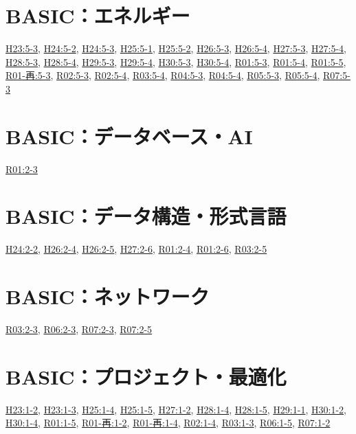 \section{BASIC：エネルギー}
\hyperref[q:h23-reg-basic-5-3]{H23:5-3}, \hyperref[q:h24-reg-basic-5-2]{H24:5-2}, \hyperref[q:h24-reg-basic-5-3]{H24:5-3}, \hyperref[q:h25-reg-basic-5-1]{H25:5-1}, \hyperref[q:h25-reg-basic-5-2]{H25:5-2}, \hyperref[q:h26-reg-basic-5-3]{H26:5-3}, \hyperref[q:h26-reg-basic-5-4]{H26:5-4}, \hyperref[q:h27-reg-basic-5-3]{H27:5-3}, \hyperref[q:h27-reg-basic-5-4]{H27:5-4}, \hyperref[q:h28-reg-basic-5-3]{H28:5-3}, \hyperref[q:h28-reg-basic-5-4]{H28:5-4}, \hyperref[q:h29-reg-basic-5-3]{H29:5-3}, \hyperref[q:h29-reg-basic-5-4]{H29:5-4}, \hyperref[q:h30-reg-basic-5-3]{H30:5-3}, \hyperref[q:h30-reg-basic-5-4]{H30:5-4}, \hyperref[q:r01-reg-basic-5-3]{R01:5-3}, \hyperref[q:r01-reg-basic-5-4]{R01:5-4}, \hyperref[q:r01-reg-basic-5-5]{R01:5-5}, \hyperref[q:r01-ret-basic-5-3]{R01-再:5-3}, \hyperref[q:r02-reg-basic-5-3]{R02:5-3}, \hyperref[q:r02-reg-basic-5-4]{R02:5-4}, \hyperref[q:r03-reg-basic-5-4]{R03:5-4}, \hyperref[q:r04-reg-basic-5-3]{R04:5-3}, \hyperref[q:r04-reg-basic-5-4]{R04:5-4}, \hyperref[q:r05-reg-basic-5-3]{R05:5-3}, \hyperref[q:r05-reg-basic-5-4]{R05:5-4}, \hyperref[q:r07-reg-basic-5-3]{R07:5-3}
\section{BASIC：データベース・AI}
\hyperref[q:r01-reg-basic-2-3]{R01:2-3}
\section{BASIC：データ構造・形式言語}
\hyperref[q:h24-reg-basic-2-2]{H24:2-2}, \hyperref[q:h26-reg-basic-2-4]{H26:2-4}, \hyperref[q:h26-reg-basic-2-5]{H26:2-5}, \hyperref[q:h27-reg-basic-2-6]{H27:2-6}, \hyperref[q:r01-reg-basic-2-4]{R01:2-4}, \hyperref[q:r01-reg-basic-2-6]{R01:2-6}, \hyperref[q:r03-reg-basic-2-5]{R03:2-5}
\section{BASIC：ネットワーク}
\hyperref[q:r03-reg-basic-2-3]{R03:2-3}, \hyperref[q:r06-reg-basic-2-3]{R06:2-3}, \hyperref[q:r07-reg-basic-2-3]{R07:2-3}, \hyperref[q:r07-reg-basic-2-5]{R07:2-5}
\section{BASIC：プロジェクト・最適化}
\hyperref[q:h23-reg-basic-1-2]{H23:1-2}, \hyperref[q:h23-reg-basic-1-3]{H23:1-3}, \hyperref[q:h25-reg-basic-1-4]{H25:1-4}, \hyperref[q:h25-reg-basic-1-5]{H25:1-5}, \hyperref[q:h27-reg-basic-1-2]{H27:1-2}, \hyperref[q:h28-reg-basic-1-4]{H28:1-4}, \hyperref[q:h28-reg-basic-1-5]{H28:1-5}, \hyperref[q:h29-reg-basic-1-1]{H29:1-1}, \hyperref[q:h30-reg-basic-1-2]{H30:1-2}, \hyperref[q:h30-reg-basic-1-4]{H30:1-4}, \hyperref[q:r01-reg-basic-1-5]{R01:1-5}, \hyperref[q:r01-ret-basic-1-2]{R01-再:1-2}, \hyperref[q:r01-ret-basic-1-4]{R01-再:1-4}, \hyperref[q:r02-reg-basic-1-4]{R02:1-4}, \hyperref[q:r03-reg-basic-1-3]{R03:1-3}, \hyperref[q:r06-reg-basic-1-5]{R06:1-5}, \hyperref[q:r07-reg-basic-1-2]{R07:1-2}
